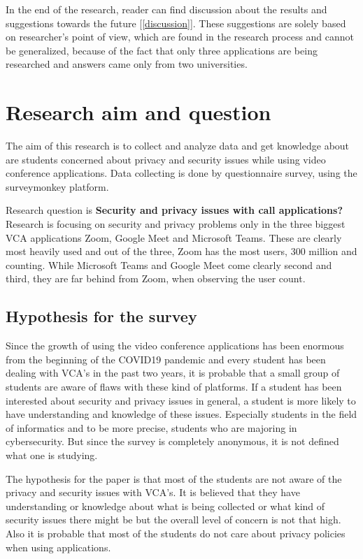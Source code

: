 \documentclass[utf8,english]{gradu3}
\begin{document}
%
In the end of the research, reader can find discussion about the results and suggestions towards the future [\ref{discussion}]. These suggestions are solely based on researcher's point of view, which are found in the research process and cannot be generalized, because of the fact that only three applications are being researched and answers came only from two universities.


\chapter{Research aim and question}
\label{researchquestion}
The aim of this research is to collect and analyze data and get knowledge about are students concerned about privacy and security issues while using video conference applications. Data collecting is done by questionnaire survey, using the surveymonkey platform.

Research question is \textbf{Security and privacy issues with call applications?}
Research is focusing on security and privacy problems only in the three biggest VCA applications Zoom, Google Meet and Microsoft Teams. These are clearly most heavily used and out of the three, Zoom has the most users, 300 million and counting. While Microsoft Teams and Google Meet come clearly second and third, they are far behind from Zoom, when observing the user count.

\section{Hypothesis for the survey}
Since the growth of using the video conference applications has been enormous from the beginning of the COVID19 pandemic and every student has been dealing with VCA's in the past two years, it is probable that a small group of students are aware of flaws with these kind of platforms. If a student has been interested about security and privacy issues in general, a student is more likely to have understanding and knowledge of these issues. Especially students in the field of informatics and to be more precise, students who are majoring in cybersecurity. But since the survey is completely anonymous, it is not defined what one is studying.

The hypothesis for the paper is that most of the students are not aware of the privacy and security issues with VCA's. It is believed that they have understanding or knowledge about what is being collected or what kind of security issues there might be but the overall level of concern is not that high. Also it is probable that most of the students do not care about privacy policies when using applications.
\end{document}
